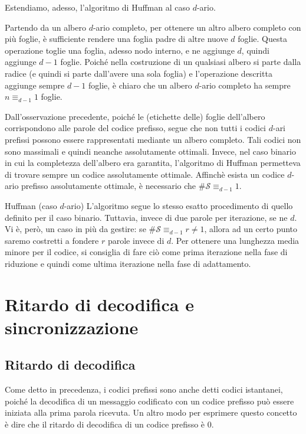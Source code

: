 Estendiamo, adesso, l'algoritmo di Huffman al caso \(d\)-ario. 

\begin{observation}{}
  Partendo da un albero $d$-ario completo, per ottenere un altro albero completo con più foglie, è sufficiente rendere una foglia padre di altre nuove $d$ foglie. Questa operazione toglie una foglia, adesso nodo interno, e ne aggiunge $d$, quindi aggiunge $d-1$ foglie. Poiché nella costruzione di un qualsiasi albero si parte dalla radice (e quindi si parte dall'avere una sola foglia) e l'operazione descritta aggiunge sempre $d -1$ foglie, è chiaro che un albero $d$-ario completo ha sempre \(n \equiv_{d-1} 1\) foglie. 
\end{observation}

Dall'osservazione precedente, poiché le (etichette delle) foglie dell'albero corrispondono alle parole del codice prefisso, segue che non tutti i codici $d$-ari prefissi possono essere rappresentati mediante un albero completo. Tali codici non sono massimali e quindi neanche assolutamente ottimali. Invece, nel caso binario in cui la completezza dell'albero era garantita, l'algoritmo di Huffman permetteva di trovare sempre un codice assolutamente ottimale. 
Affinchè esista un codice $d$-ario prefisso assolutamente ottimale, è necessario che $\#\mathcal{S} \equiv_{d-1} 1$.

\begin{algorithmdesc}{Huffman (caso $d$-ario)}
  L'algoritmo segue lo stesso esatto procedimento di quello definito per il caso binario. Tuttavia, invece di  due parole per iterazione, se ne  $d$. Vi è, però, un caso in più da gestire: se $\#\mathcal{S} \equiv_{d-1} r \neq 1$, allora ad un certo punto saremo costretti a fondere $r$ parole invece di $d$. Per ottenere una lunghezza media minore per il codice, si consiglia di fare ciò come prima iterazione nella fase di riduzione e quindi come ultima iterazione nella fase di adattamento.  
\end{algorithmdesc}

\section{Ritardo di decodifica e sincronizzazione}

\subsection{Ritardo di decodifica}
Come detto in precedenza, i codici prefissi sono anche detti codici istantanei, poiché la decodifica di un messaggio codificato con un codice prefisso può essere iniziata alla prima parola ricevuta.
Un altro modo per esprimere questo concetto è dire che il ritardo di decodifica di un codice prefisso è \(0\).


